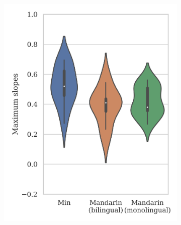 \begin{figure}[hbt!]
\centering
\begin{subfigure}[b]{.49\textwidth}
\centering
\includegraphics[width=\textwidth]{figures/E3/Result_51_advanced.png}
\end{subfigure}
\hfill
\begin{subfigure}[b]{.49\textwidth}
\centering

\end{subfigure}
\end{figure}
